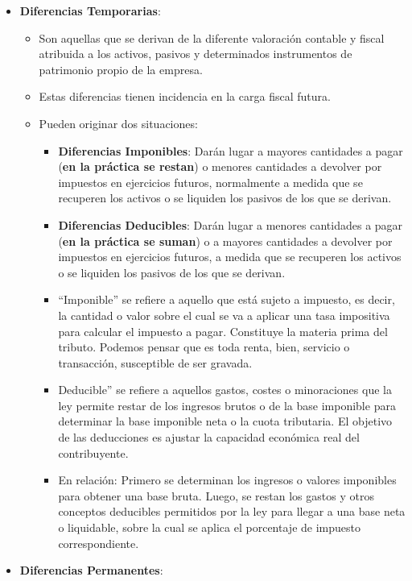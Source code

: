 \documentclass[
  paper=a4,
  ,captions=tableheading
]{scrbook}
\providecommand{\tightlist}{%
  \setlength{\itemsep}{0pt}\setlength{\parskip}{0pt}}
\begin{document}
\begin{itemize}
\tightlist
\item
  \textbf{Diferencias Temporarias}:

  \begin{itemize}
  \tightlist
  \item
    Son aquellas que se derivan de la diferente valoración contable y
    fiscal atribuida a los activos, pasivos y determinados instrumentos
    de patrimonio propio de la empresa.
  \item
    Estas diferencias tienen incidencia en la carga fiscal futura.
  \item
    Pueden originar dos situaciones:

    \begin{itemize}
    \tightlist
    \item
      \textbf{Diferencias Imponibles}: Darán lugar a mayores cantidades
      a pagar (\textbf{en la práctica se restan}) o menores cantidades a
      devolver por impuestos en ejercicios futuros, normalmente a medida
      que se recuperen los activos o se liquiden los pasivos de los que
      se derivan.
    \item
      \textbf{Diferencias Deducibles}: Darán lugar a menores cantidades
      a pagar (\textbf{en la práctica se suman}) o a mayores cantidades
      a devolver por impuestos en ejercicios futuros, a medida que se
      recuperen los activos o se liquiden los pasivos de los que se
      derivan.
    \item
      ``Imponible'' se refiere a aquello que está sujeto a impuesto, es
      decir, la cantidad o valor sobre el cual se va a aplicar una tasa
      impositiva para calcular el impuesto a pagar. Constituye la
      materia prima del tributo. Podemos pensar que es toda renta, bien,
      servicio o transacción, susceptible de ser gravada.
    \item
      Deducible'' se refiere a aquellos gastos, costes o minoraciones
      que la ley permite restar de los ingresos brutos o de la base
      imponible para determinar la base imponible neta o la cuota
      tributaria. El objetivo de las deducciones es ajustar la capacidad
      económica real del contribuyente.
    \item
      En relación: Primero se determinan los ingresos o valores
      imponibles para obtener una base bruta. Luego, se restan los
      gastos y otros conceptos deducibles permitidos por la ley para
      llegar a una base neta o liquidable, sobre la cual se aplica el
      porcentaje de impuesto correspondiente.
    \end{itemize}
  \end{itemize}
\item
  \textbf{Diferencias Permanentes}:


\end{itemize}
\end{document}
